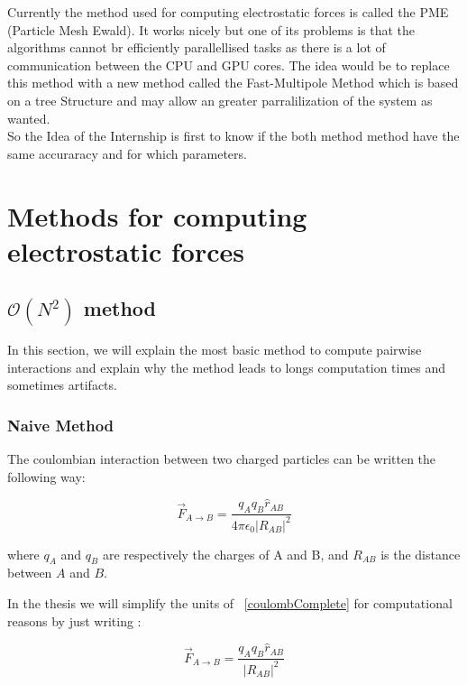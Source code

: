 \documentclass[11pt,twoside,a4paper]{report}
\begin{document}
Currently the method used for computing electrostatic forces is called the PME (Particle Mesh Ewald). It works nicely but one of its problems is that the algorithms cannot br efficiently parallellised tasks as there is a lot of communication between the CPU and GPU cores. The idea would be to replace this method with a new method called the Fast-Multipole Method which is based on a tree Structure and may allow an greater parralilization of the system as wanted.\\

So the Idea of the Internship is first to know if the both method method have the same accuraracy and for which parameters.


\chapter{Methods for computing electrostatic forces}


\section{$\mathcal{O}(N^2)$ method }


In this section, we will explain the most basic method to compute pairwise interactions and explain why the method leads to longs computation times and sometimes artifacts.

\subsection{Naive Method}

The coulombian interaction between two charged particles can be written the following way:

\begin{equation}
	\overrightarrow{F}_{A \rightarrow B} = \frac{q_A q_B \hat{r}_{AB} }{4\pi\epsilon_0|R_{AB}|^2}
	\label{coulombComplete}
\end{equation}

where $q_A $ and $q_B$ are respectively the charges of A and B, and $R_{AB}$ is the distance between $A$ and $B$.

In the thesis we will simplify the units of ~\eqref{coulombComplete} for computational reasons by just writing :

\begin{equation}
	\overrightarrow{F}_{A \rightarrow B} = \frac{q_A q_B \hat{r}_{AB} }{|R_{AB}|^2}
	\label{coulombSimplified}
\end{equation}
\end{document}
